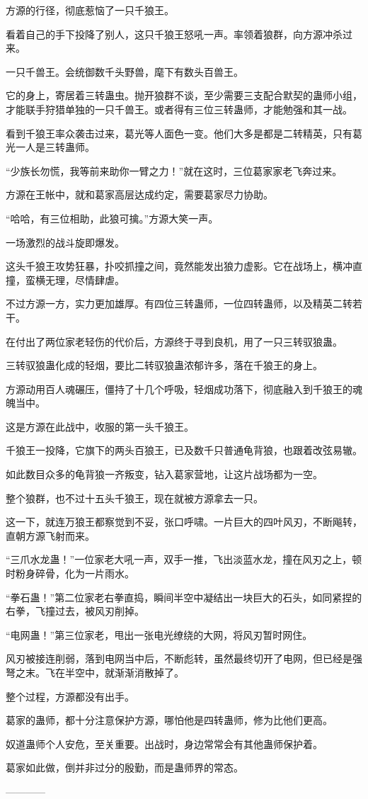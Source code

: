 \begin{this_body}
方源的行径，彻底惹恼了一只千狼王。

看着自己的手下投降了别人，这只千狼王怒吼一声。率领着狼群，向方源冲杀过来。

一只千兽王。会统御数千头野兽，麾下有数头百兽王。

它的身上，寄居着三转蛊虫。抛开狼群不谈，至少需要三支配合默契的蛊师小组，才能联手狩猎单独的一只千兽王。或者得有三位三转蛊师，才能勉强和其一战。

看到千狼王率众袭击过来，葛光等人面色一变。他们大多是都是二转精英，只有葛光一人是三转蛊师。

“少族长勿慌，我等前来助你一臂之力！”就在这时，三位葛家家老飞奔过来。

方源在王帐中，就和葛家高层达成约定，需要葛家尽力协助。

“哈哈，有三位相助，此狼可擒。”方源大笑一声。

一场激烈的战斗旋即爆发。

这头千狼王攻势狂暴，扑咬抓撞之间，竟然能发出狼力虚影。它在战场上，横冲直撞，蛮横无理，尽情肆虐。

不过方源一方，实力更加雄厚。有四位三转蛊师，一位四转蛊师，以及精英二转若干。

在付出了两位家老轻伤的代价后，方源终于寻到良机，用了一只三转驭狼蛊。

三转驭狼蛊化成的轻烟，要比二转驭狼蛊浓郁许多，落在千狼王的身上。

方源动用百人魂碾压，僵持了十几个呼吸，轻烟成功落下，彻底融入到千狼王的魂魄当中。

这是方源在此战中，收服的第一头千狼王。

千狼王一投降，它旗下的两头百狼王，已及数千只普通龟背狼，也跟着改弦易辙。

如此数目众多的龟背狼一齐叛变，钻入葛家营地，让这片战场都为一空。

整个狼群，也不过十五头千狼王，现在就被方源拿去一只。

这一下，就连万狼王都察觉到不妥，张口呼啸。一片巨大的四叶风刃，不断飚转，直朝方源飞射而来。

“三爪水龙蛊！”一位家老大吼一声，双手一推，飞出淡蓝水龙，撞在风刃之上，顿时粉身碎骨，化为一片雨水。

“拳石蛊！”第二位家老右拳直捣，瞬间半空中凝结出一块巨大的石头，如同紧捏的右拳，飞撞过去，被风刃削掉。

“电网蛊！”第三位家老，甩出一张电光缭绕的大网，将风刃暂时网住。

风刃被接连削弱，落到电网当中后，不断彪转，虽然最终切开了电网，但已经是强弩之末。飞在半空中，就渐渐消散掉了。

整个过程，方源都没有出手。

葛家的蛊师，都十分注意保护方源，哪怕他是四转蛊师，修为比他们更高。

奴道蛊师个人安危，至关重要。出战时，身边常常会有其他蛊师保护着。

葛家如此做，倒并非过分的殷勤，而是蛊师界的常态。

------------

\end{this_body}

